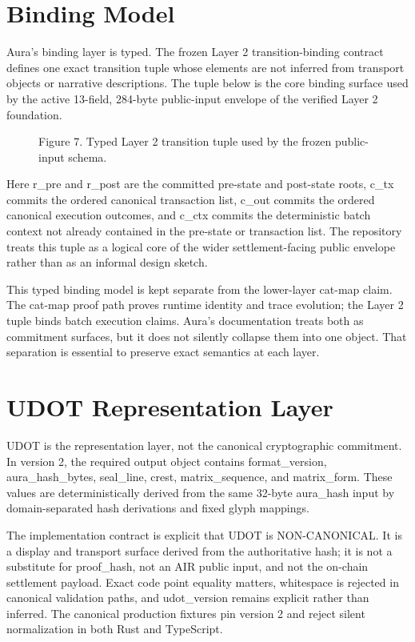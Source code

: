 \documentclass[conference]{IEEEtran}
\begin{document}
\section{Binding Model}
Aura's binding layer is typed. The frozen Layer 2 transition-binding contract defines one exact transition tuple whose elements are not inferred from transport objects or narrative descriptions. The tuple below is the core binding surface used by the active 13-field, 284-byte public-input envelope of the verified Layer 2 foundation.

\begin{figure}[t]
\centering

\caption{Figure 7. Typed Layer 2 transition tuple used by the frozen public-input schema.}
\end{figure}
Here r\_pre and r\_post are the committed pre-state and post-state roots, c\_tx commits the ordered canonical transaction list, c\_out commits the ordered canonical execution outcomes, and c\_ctx commits the deterministic batch context not already contained in the pre-state or transaction list. The repository treats this tuple as a logical core of the wider settlement-facing public envelope rather than as an informal design sketch.

This typed binding model is kept separate from the lower-layer cat-map claim. The cat-map proof path proves runtime identity and trace evolution; the Layer 2 tuple binds batch execution claims. Aura's documentation treats both as commitment surfaces, but it does not silently collapse them into one object. That separation is essential to preserve exact semantics at each layer.

\section{UDOT Representation Layer}
UDOT is the representation layer, not the canonical cryptographic commitment. In version 2, the required output object contains format\_version, aura\_hash\_bytes, seal\_line, crest, matrix\_sequence, and matrix\_form. These values are deterministically derived from the same 32-byte aura\_hash input by domain-separated hash derivations and fixed glyph mappings.

The implementation contract is explicit that UDOT is NON-CANONICAL. It is a display and transport surface derived from the authoritative hash; it is not a substitute for proof\_hash, not an AIR public input, and not the on-chain settlement payload. Exact code point equality matters, whitespace is rejected in canonical validation paths, and udot\_version remains explicit rather than inferred. The canonical production fixtures pin version 2 and reject silent normalization in both Rust and TypeScript.
\end{document}
